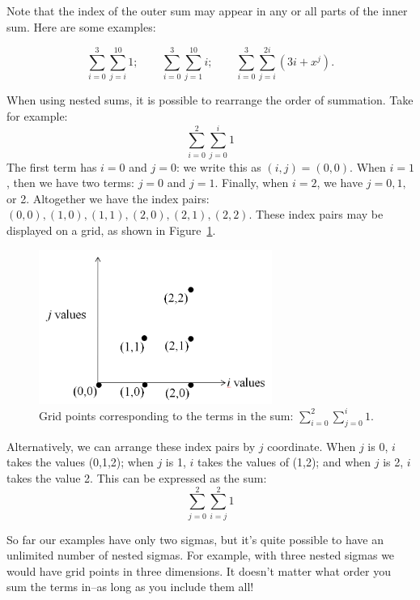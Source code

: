  Note that the index of the outer sum may appear in any or all parts of the inner sum. Here are some examples:  

\[\sum_{i=0}^{3} \sum_{j=i}^{10}1; \qquad
\sum_{i=0}^{3} \sum_{j=1}^{10}i ; \qquad
\sum_{i=0}^{3}\sum_{j=i}^{2i}(3i+x^j).\]

When using nested sums, it is possible to rearrange the order of summation.  Take for example:
\[\sum_{i=0}^{2}  \sum_{j=0}^{i}1 \]
The first term has $i=0$ and $j=0$: we write this as $(i,j)=(0,0)$. When $i=1$, then we have two terms:  $j=0$ and $j=1$. Finally, when $i=2$, we have $j=0,1,$ or 2.  Altogether we have the index pairs: $(0,0), (1,0), (1,1), (2,0), (2,1), (2,2)$. These index pairs may be displayed on a grid, as shown in Figure~\ref{fig:summation1}.
\begin{figure}[htb]
\begin{center}
	\includegraphics[width=3.0in]{images/i02j0igraph.png}
\caption{\label{fig:summation1} Grid points corresponding to the terms in the sum: $ \sum_{i=0}^{2}  \sum_{j=0}^{i}1 $.}
\end{center}
\end{figure} 

Alternatively, we can arrange these index pairs by $j$ coordinate.  When $j$ is 0, $i$ takes the values (0,1,2); when $j$ is 1, $i$ takes the values of (1,2); and when $j$ is 2, $i$ takes the value 2.  This can be expressed as the sum:
\[\sum_{j=0}^{2} \sum_{i=j}^{2}1 \]

So far our examples have only two sigmas, but it's quite possible to have an unlimited number of nested sigmas. For example, with three nested sigmas we would have grid points in three dimensions.  It doesn't matter what order you sum the terms in--as long as you include them all!

